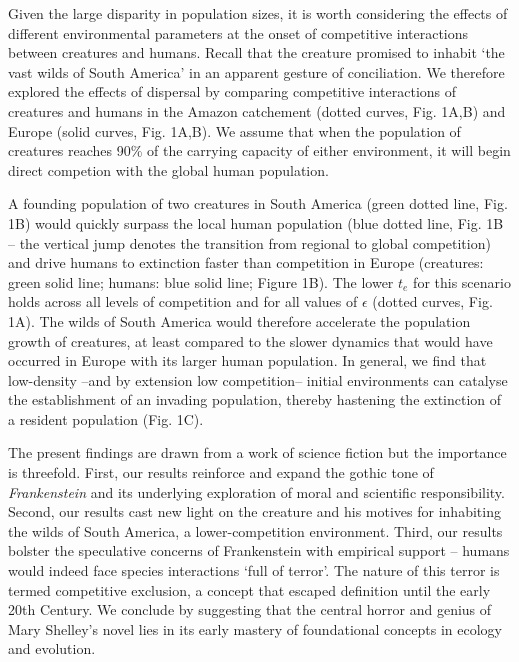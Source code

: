 \documentclass{article}[10pt]
\begin{document}
Given the large disparity in population sizes, it is worth considering the effects of different environmental parameters at the onset of competitive interactions between creatures and humans.
Recall that the creature promised to inhabit `the vast wilds of South America' in an apparent gesture of conciliation.
We therefore explored the effects of dispersal by comparing competitive interactions of creatures and humans in the Amazon catchement (dotted curves, Fig. 1A,B) and Europe (solid curves, Fig. 1A,B).
We assume that when the population of creatures reaches 90\% of the carrying capacity of either environment, it will begin direct competion with the global human population.

A founding population of two creatures in South America (green dotted line, Fig. 1B) would quickly surpass the local human population (blue dotted line, Fig. 1B -- the vertical jump denotes the transition from regional to global competition) and drive humans to extinction faster than competition in Europe (creatures: green solid line; humans: blue solid line; Figure 1B).
The lower $t_e$ for this scenario holds across all levels of competition and for all values of $\epsilon$ (dotted curves, Fig. 1A).
The wilds of South America would therefore accelerate the population growth of creatures, at least compared to the slower dynamics that would have occurred in Europe with its larger human population.
In general, we find that low-density --and by extension low competition-- initial environments can catalyse the establishment of an invading population, thereby hastening the extinction of a resident population (Fig. 1C).

The present findings are drawn from a work of science fiction but the importance is threefold. 
First, our results reinforce and expand the gothic tone of \textit{Frankenstein} and its underlying exploration of moral and scientific responsibility.
Second, our results cast new light on the creature and his motives for inhabiting the wilds of South America, a lower-competition environment.
Third, our results bolster the speculative concerns of Frankenstein with empirical support -- humans would indeed face species interactions `full of terror'. 
The nature of this terror is termed competitive exclusion, a concept that escaped definition until the early 20th Century. 
We conclude by suggesting that the central horror and genius of Mary Shelley's novel lies in its early mastery of foundational concepts in ecology and evolution.
\end{document}
